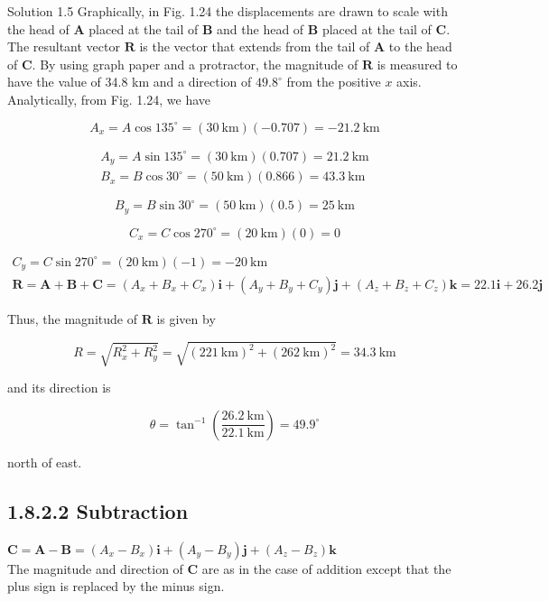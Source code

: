 \documentclass[10pt]{article}
\begin{document}
Solution 1.5 Graphically, in Fig. 1.24 the displacements are drawn to scale with the head of $\mathbf{A}$ placed at the tail of $\mathbf{B}$ and the head of $\mathbf{B}$ placed at the tail of $\mathbf{C}$. The resultant vector $\mathbf{R}$ is the vector that extends from the tail of $\mathbf{A}$ to the head of $\mathbf{C}$. By using graph paper and a protractor, the magnitude of $\mathbf{R}$ is measured to have the value of 34.8 km and a direction of $49.8^{\circ}$ from the positive $x$ axis. Analytically, from Fig. 1.24, we have

$$
A_{x}=A \cos 135^{\circ}=(30 \mathrm{~km})(-0.707)=-21.2 \mathrm{~km}
$$

$$
\begin{gathered}
A_{y}=A \sin 135^{\circ}=(30 \mathrm{~km})(0.707)=21.2 \mathrm{~km} \\
B_{x}=B \cos 30^{\circ}=(50 \mathrm{~km})(0.866)=43.3 \mathrm{~km}
\end{gathered}
$$

$$
B_{y}=B \sin 30^{\circ}=(50 \mathrm{~km})(0.5)=25 \mathrm{~km}
$$

$$
C_{x}=C \cos 270^{\circ}=(20 \mathrm{~km})(0)=0
$$

$$
\begin{gathered}
C_{y}=C \sin 270^{\circ}=(20 \mathrm{~km})(-1)=-20 \mathrm{~km} \\
\mathbf{R}=\mathbf{A}+\mathbf{B}+\mathbf{C}=\left(A_{x}+B_{x}+C_{x}\right) \mathbf{i}+\left(A_{y}+B_{y}+C_{y}\right) \mathbf{j}+\left(A_{z}+B_{z}+C_{z}\right) \mathbf{k}=22.1 \mathbf{i}+26.2 \mathbf{j}
\end{gathered}
$$

Thus, the magnitude of $\mathbf{R}$ is given by

$$
R=\sqrt{R_{x}^{2}+R_{y}^{2}}=\sqrt{(221 \mathrm{~km})^{2}+(262 \mathrm{~km})^{2}}=34.3 \mathrm{~km}
$$

and its direction is

$$
\theta=\tan ^{-1}\left(\frac{26.2 \mathrm{~km}}{22.1 \mathrm{~km}}\right)=49.9^{\circ}
$$

north of east.

\subsection*{1.8.2.2 Subtraction}
$\mathbf{C}=\mathbf{A}-\mathbf{B}=\left(A_{x}-B_{x}\right) \mathbf{i}+\left(A_{y}-B_{y}\right) \mathbf{j}+\left(A_{z}-B_{z}\right) \mathbf{k}$\\
The magnitude and direction of $\mathbf{C}$ are as in the case of addition except that the plus sign is replaced by the minus sign.
\end{document}
